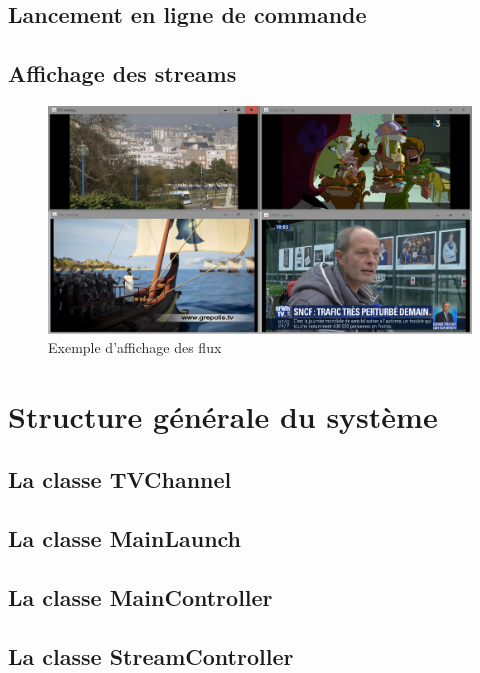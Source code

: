 \documentclass{polytech/polytech}
\begin{document}
\subsection{Lancement en ligne de commande}

\subsection{Affichage des streams}


\begin{figure}
	\includegraphics[scale=0.5]{images/affichageFlux.png}
	\caption{Exemple d'affichage des flux}
	\label{fig:affichageFlux}
\end{figure}


\section{Structure générale du système}


\subsection{La classe TVChannel}

\subsection{La classe MainLaunch}

\subsection{La classe MainController}

\subsection{La classe StreamController}
\end{document}
